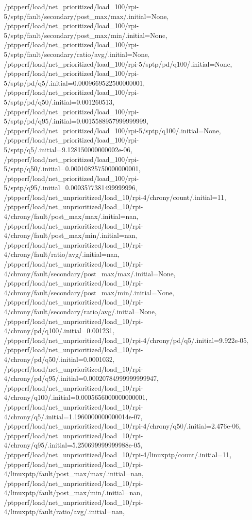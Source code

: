 {    /ptpperf/load/net_prioritized/load_100/rpi-5/sptp/fault/secondary/post_max/max/.initial=None,
    /ptpperf/load/net_prioritized/load_100/rpi-5/sptp/fault/secondary/post_max/min/.initial=None,
    /ptpperf/load/net_prioritized/load_100/rpi-5/sptp/fault/secondary/ratio/avg/.initial=None,
    /ptpperf/load/net_prioritized/load_100/rpi-5/sptp/pd/q100/.initial=None,
    /ptpperf/load/net_prioritized/load_100/rpi-5/sptp/pd/q5/.initial=0.0009669522500000001,
    /ptpperf/load/net_prioritized/load_100/rpi-5/sptp/pd/q50/.initial=0.001260513,
    /ptpperf/load/net_prioritized/load_100/rpi-5/sptp/pd/q95/.initial=0.0015588957999999999,
    /ptpperf/load/net_prioritized/load_100/rpi-5/sptp/q100/.initial=None,
    /ptpperf/load/net_prioritized/load_100/rpi-5/sptp/q5/.initial=9.128150000000002e-06,
    /ptpperf/load/net_prioritized/load_100/rpi-5/sptp/q50/.initial=0.00010825750000000001,
    /ptpperf/load/net_prioritized/load_100/rpi-5/sptp/q95/.initial=0.0003577381499999996,
    /ptpperf/load/net_unprioritized/load_10/rpi-4/chrony/count/.initial=11,
    /ptpperf/load/net_unprioritized/load_10/rpi-4/chrony/fault/post_max/max/.initial=nan,
    /ptpperf/load/net_unprioritized/load_10/rpi-4/chrony/fault/post_max/min/.initial=nan,
    /ptpperf/load/net_unprioritized/load_10/rpi-4/chrony/fault/ratio/avg/.initial=nan,
    /ptpperf/load/net_unprioritized/load_10/rpi-4/chrony/fault/secondary/post_max/max/.initial=None,
    /ptpperf/load/net_unprioritized/load_10/rpi-4/chrony/fault/secondary/post_max/min/.initial=None,
    /ptpperf/load/net_unprioritized/load_10/rpi-4/chrony/fault/secondary/ratio/avg/.initial=None,
    /ptpperf/load/net_unprioritized/load_10/rpi-4/chrony/pd/q100/.initial=0.001231,
    /ptpperf/load/net_unprioritized/load_10/rpi-4/chrony/pd/q5/.initial=9.922e-05,
    /ptpperf/load/net_unprioritized/load_10/rpi-4/chrony/pd/q50/.initial=0.0001032,
    /ptpperf/load/net_unprioritized/load_10/rpi-4/chrony/pd/q95/.initial=0.00020784999999999947,
    /ptpperf/load/net_unprioritized/load_10/rpi-4/chrony/q100/.initial=0.0005656000000000001,
    /ptpperf/load/net_unprioritized/load_10/rpi-4/chrony/q5/.initial=1.1960000000000014e-07,
    /ptpperf/load/net_unprioritized/load_10/rpi-4/chrony/q50/.initial=2.476e-06,
    /ptpperf/load/net_unprioritized/load_10/rpi-4/chrony/q95/.initial=5.250699999999988e-05,
    /ptpperf/load/net_unprioritized/load_10/rpi-4/linuxptp/count/.initial=11,
    /ptpperf/load/net_unprioritized/load_10/rpi-4/linuxptp/fault/post_max/max/.initial=nan,
    /ptpperf/load/net_unprioritized/load_10/rpi-4/linuxptp/fault/post_max/min/.initial=nan,
    /ptpperf/load/net_unprioritized/load_10/rpi-4/linuxptp/fault/ratio/avg/.initial=nan,
}
